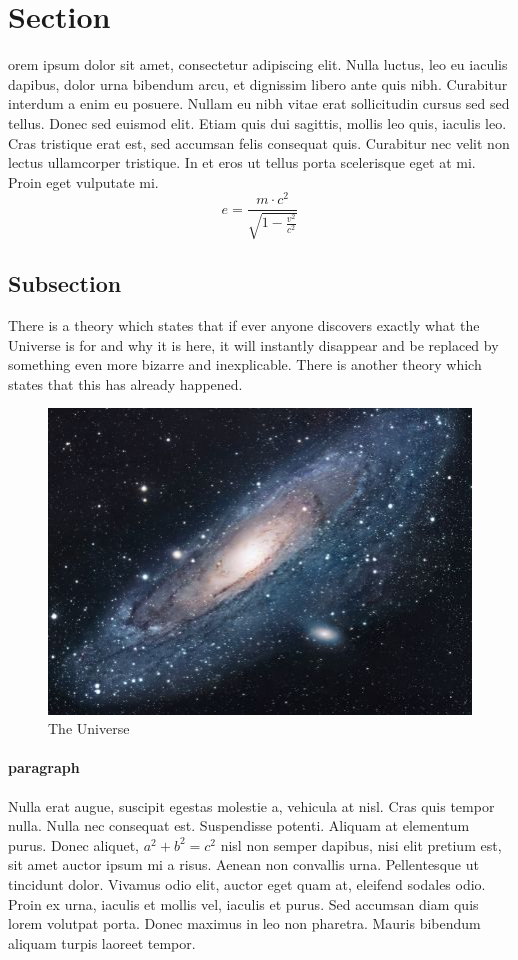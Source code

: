 \documentclass[../main.tex]{subfiles}
\begin{document}
\section{Section}
orem ipsum dolor sit amet, consectetur adipiscing elit. Nulla luctus, leo eu iaculis dapibus, dolor urna bibendum arcu, et dignissim libero ante quis nibh. Curabitur interdum a enim eu posuere. Nullam eu nibh vitae erat sollicitudin cursus sed sed tellus. Donec sed euismod elit. Etiam quis dui sagittis, mollis leo quis, iaculis leo. Cras tristique erat est, sed accumsan felis consequat quis. Curabitur nec velit non lectus ullamcorper tristique. In et eros ut tellus porta scelerisque eget at mi. Proin eget vulputate mi.
\begin{equation}
    e = \frac{m \cdot c^2}{\sqrt{1 - \frac{v^2}{c^2}}}
\end{equation}

\subsection{Subsection}
There is a theory which states that if ever anyone discovers exactly what the Universe is for and why it is here, it will instantly disappear and be replaced by something even more bizarre and inexplicable.
There is another theory which states that this has already happened.

\begin{figure}[h!]
\centering
\includegraphics[scale=1.7]{universe}
\caption{The Universe}
\label{fig:universe}
\end{figure}

\paragraph{paragraph}
Nulla erat augue, suscipit egestas molestie a, vehicula at nisl. Cras quis tempor nulla. Nulla nec consequat est. Suspendisse potenti. Aliquam at elementum purus. Donec aliquet, $ a^2 + b^2 = c^2$ nisl non semper dapibus, nisi elit pretium est, sit amet auctor ipsum mi a risus. Aenean non convallis urna. Pellentesque ut tincidunt dolor. Vivamus odio elit, auctor eget quam at, eleifend sodales odio. Proin ex urna, iaculis et mollis vel, iaculis et purus. Sed accumsan diam quis lorem volutpat porta. Donec maximus in leo non pharetra. Mauris bibendum aliquam turpis laoreet tempor.
\end{document}
